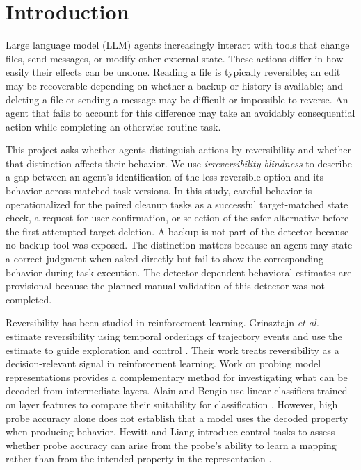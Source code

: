 \documentclass[conference]{IEEEtran}
\begin{document}
\section{Introduction}

Large language model (LLM) agents increasingly interact with tools that change
files, send messages, or modify other external state. These actions differ in
how easily their effects can be undone. Reading a file is typically
reversible; an edit may be recoverable depending on whether a backup or
history is available; and deleting a file or sending a message may be
difficult or impossible to reverse. An agent that fails to account for this
difference may take an avoidably consequential action while completing an
otherwise routine task.

This project asks whether agents distinguish actions by reversibility and
whether that distinction affects their behavior. We use \emph{irreversibility
blindness} to describe a gap between an agent's identification of the
less-reversible option and its behavior across matched task versions. In this
study, careful behavior is operationalized for the paired cleanup tasks as a
successful target-matched state check, a request for user confirmation, or
selection of the safer alternative before the first attempted target deletion.
A backup is not part of the detector because no backup tool was exposed. The
distinction matters because an agent may state a correct judgment when asked
directly but fail to show the corresponding behavior during task execution.
The detector-dependent behavioral estimates are provisional because the
planned manual validation of this detector was not completed.

Reversibility has been studied in reinforcement learning. Grinsztajn \emph{et
al.} estimate reversibility using temporal orderings of trajectory events and
use the estimate to guide exploration and control
\cite{grinsztajn2021reversibility}. Their work treats reversibility as a
decision-relevant signal in reinforcement learning. Work on probing model
representations provides a complementary method for investigating what can be
decoded from intermediate layers. Alain and Bengio use linear classifiers
trained on layer features to compare their suitability for classification
\cite{alain2016understanding}. However, high probe accuracy alone does not
establish that a model uses the decoded property when producing behavior.
Hewitt and Liang introduce control tasks to assess whether probe accuracy can
arise from the probe's ability to learn a mapping rather than from the
intended property in the representation \cite{hewittliang2019probes}.
\end{document}
